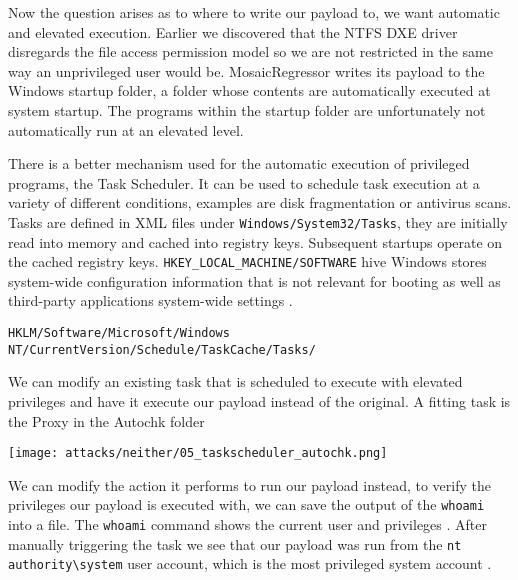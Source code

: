 Now the question arises as to where to write our payload to, we want automatic and elevated execution. Earlier we discovered that the NTFS DXE driver disregards the file access permission model so we are not restricted in the same way an unprivileged user would be. MosaicRegressor writes its payload to the Windows startup folder, a folder whose contents are automatically executed at system startup. The programs within the startup folder are unfortunately not automatically run at an elevated level.



There is a better mechanism used for the automatic execution of privileged programs, the Task Scheduler. It can be used to schedule task execution at a variety of different conditions, examples are disk fragmentation or antivirus scans.
Tasks are defined in \ac{XML} files under \lstinline{Windows/System32/Tasks}, they are initially read into memory and cached into registry keys. Subsequent startups operate on the cached registry keys.
\lstinline{HKEY_LOCAL_MACHINE/SOFTWARE} hive
Windows stores system-wide configuration information that is not relevant for booting as well as third-party applications system-wide settings \cite[10. The registry - Registry logical structure - \lstinline{HKEY_LOCAL_MACHINE}]{windows-internals-7-part2}.

\lstinline{HKLM/Software/Microsoft/Windows NT/CurrentVersion/Schedule/TaskCache/Tasks/}

\cite{windows-internals-7-part2}

We can modify an existing task that is scheduled to execute with elevated privileges and have it execute our payload instead of the original. A fitting task is the Proxy in the Autochk folder

\texttt{[image: attacks/neither/05\_taskscheduler\_autochk.png]}

We can modify the action it performs to run our payload instead, to verify the privileges our payload is executed with, we can save the output of the \lstinline{whoami} into a file. The \lstinline{whoami} command shows the current user and privileges \cite{microsoft-whoami}. After manually triggering the task we see that our payload was run from the \lstinline{nt authority\system} user account, which is the most privileged system account \cite{microsoft-localsystem-account}.


